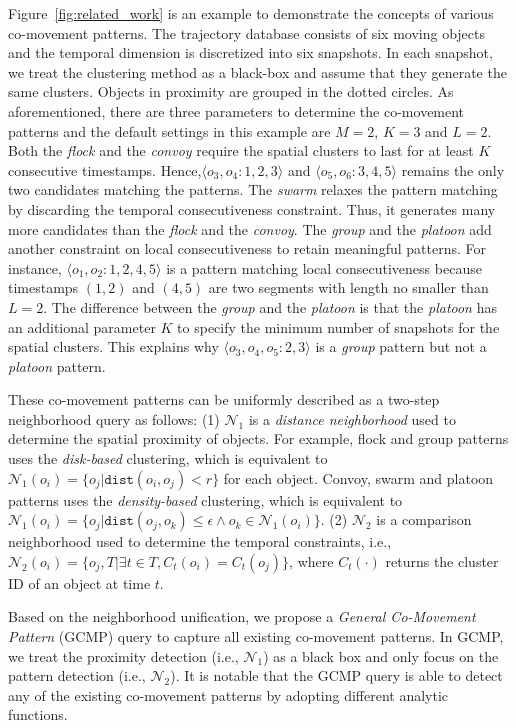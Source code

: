 Figure~\ref{fig:related_work} is an example to demonstrate the concepts of various co-movement patterns. The trajectory database consists of six moving objects and the temporal dimension is discretized into six snapshots. In each snapshot, we treat the clustering method as a black-box and assume that they generate the same clusters. Objects in proximity are grouped in the dotted circles. As aforementioned, there are three parameters to determine the co-movement patterns and the default settings in this example are $M=2$, $K=3$ and $L=2$. Both the \emph{flock} and the \emph{convoy} require the spatial clusters to last for at least $K$ consecutive  timestamps. Hence,$\langle o_3,o_4:1,2,3 \rangle$ and $\langle o_5,o_6:3,4,5 \rangle$  remains the only two candidates matching the patterns. The \textit{swarm} relaxes the pattern matching by discarding the temporal consecutiveness constraint. Thus, it generates many more candidates than the \textit{flock} and the \textit{convoy}. The \textit{group} and the \textit{platoon} add another constraint on local consecutiveness to retain meaningful patterns. For instance, $\langle o_1,o_2:1,2,4,5 \rangle$ is a pattern matching local consecutiveness because timestamps $(1,2)$ and $(4,5)$ are two segments with length no smaller than $L=2$. The difference between the \textit{group} and the \textit{platoon} is that the \textit{platoon} has an additional parameter $K$ to specify the minimum number of snapshots for the spatial clusters. This explains why $\langle o_3,o_4,o_5:2,3 \rangle$ is a \textit{group} pattern but not a \textit{platoon} pattern.


These co-movement patterns can be uniformly described as a two-step neighborhood query as follows:
	(1) $\mathcal{N}_1$ is a \emph{distance neighborhood} used to determine the spatial proximity of objects. For example,  flock and group patterns uses the \emph{disk-based} clustering, which is equivalent to $\mathcal{N}_1(o_i)= \{o_j | \mathtt{dist}(o_i,o_j) < r \}$ for each object. Convoy, swarm and platoon patterns uses the \emph{density-based} clustering, which is equivalent to $\mathcal{N}_1(o_i)= \{o_j | \mathtt{dist}(o_j,o_k) \leq \epsilon \wedge o_k \in \mathcal{N}_1(o_i)\}$.
	(2) $\mathcal{N}_2$ is a comparison neighborhood used to determine the temporal constraints, i.e., $\mathcal{N}_2(o_i)=\{o_j, T | \exists t \in T, C_t(o_i) = C_t(o_j)\}$, where $C_t(\cdot)$ returns the cluster ID of an object at time $t$.

Based on the neighborhood unification, we propose a \emph{General Co-Movement Pattern} (GCMP)
query to capture all existing co-movement patterns. In GCMP, we treat the proximity detection (i.e., $\mathcal{N}_1$) as
a black box and only focus on the pattern detection (i.e., $\mathcal{N}_2$). It is notable that the GCMP
query is able to detect any of the existing co-movement patterns by adopting different analytic functions.


